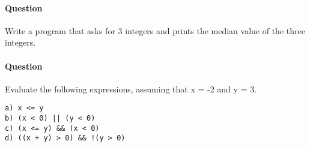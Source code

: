\documentclass{article}
\begin{document}
\addtocounter{question_num}{1}
\paragraph{Question }
Write a program that asks for 3 integers and prints the median value of the three integers.

\addtocounter{question_num}{1}
\paragraph{Question }
Evaluate the following expressions, assuming that x = -2 and y = 3.
\begin{lstlisting} 
a) x <= y 
b) (x < 0) || (y < 0)
c) (x <= y) && (x < 0)
d) ((x + y) > 0) && !(y > 0)
\end{lstlisting}
\end{document}

